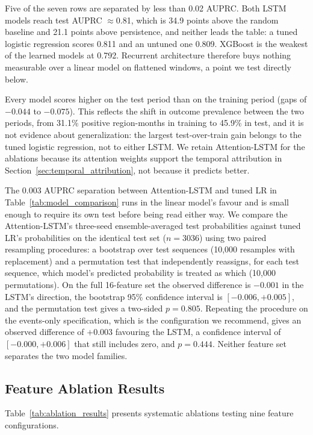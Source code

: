 \documentclass[pdflatex,sn-mathphys-num]{sn-jnl}%
\theoremstyle{thmstyleone}%
\theoremstyle{thmstyletwo}%
\theoremstyle{thmstylethree}%
\begin{document}
Five of the seven rows are separated by less than 0.02 AUPRC. Both LSTM models reach test AUPRC ${\approx}$0.81, which is 34.9 points above the random baseline and 21.1 points above persistence, and neither leads the table: a tuned logistic regression scores 0.811 and an untuned one 0.809. XGBoost is the weakest of the learned models at 0.792. Recurrent architecture therefore buys nothing measurable over a linear model on flattened windows, a point we test directly below.

Every model scores higher on the test period than on the training period (gaps of $-0.044$ to $-0.075$). This reflects the shift in outcome prevalence between the two periods, from 31.1\% positive region-months in training to 45.9\% in test, and it is not evidence about generalization: the largest test-over-train gain belongs to the tuned logistic regression, not to either LSTM. We retain Attention-LSTM for the ablations because its attention weights support the temporal attribution in Section~\ref{sec:temporal_attribution}, not because it predicts better.

The 0.003 AUPRC separation between Attention-LSTM and tuned LR in Table~\ref{tab:model_comparison} runs in the linear model's favour and is small enough to require its own test before being read either way. We compare the Attention-LSTM's three-seed ensemble-averaged test probabilities against tuned LR's probabilities on the identical test set ($n=3036$) using two paired resampling procedures: a bootstrap over test sequences (10,000 resamples with replacement) and a permutation test that independently reassigns, for each test sequence, which model's predicted probability is treated as which (10,000 permutations). On the full 16-feature set the observed difference is $-0.001$ in the LSTM's direction, the bootstrap 95\% confidence interval is $[-0.006, +0.005]$, and the permutation test gives a two-sided $p=0.805$. Repeating the procedure on the events-only specification, which is the configuration we recommend, gives an observed difference of $+0.003$ favouring the LSTM, a confidence interval of $[-0.000, +0.006]$ that still includes zero, and $p=0.444$. Neither feature set separates the two model families.

\subsection{Feature Ablation Results}

Table~\ref{tab:ablation_results} presents systematic ablations testing nine feature configurations.
\end{document}
